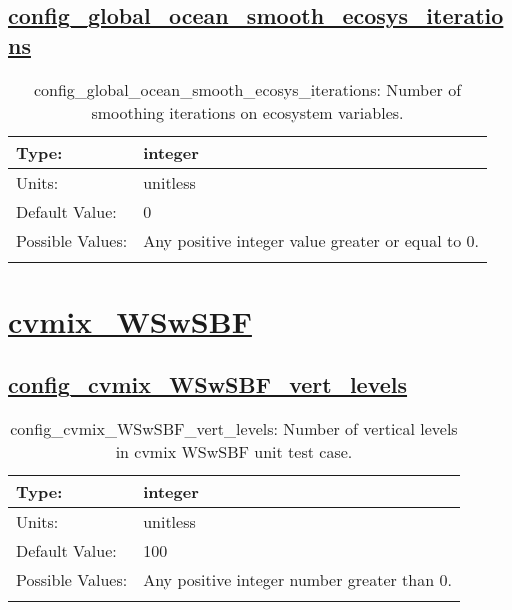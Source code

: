 \subsection[config\_global\_ocean\_smooth\_ecosys\_iterations]{\hyperref[sec:nm_tab_global_ocean]{config\_global\_ocean\_smooth\_ecosys\_iterations}}
\label{subsec:nm_sec_config_global_ocean_smooth_ecosys_iterations}
\begin{center}
\begin{longtable}{| p{2.0in} || p{4.0in} |}
    \hline
    Type: & integer \\
    \hline
    Units: & \si{unitless} \\
    \hline
    Default Value: & 0 \\
    \hline
    Possible Values: & Any positive integer value greater or equal to 0. \\
    \hline
    \caption{config\_global\_ocean\_smooth\_ecosys\_iterations: Number of smoothing iterations on ecosystem variables.}
\end{longtable}
\end{center}
\section[cvmix\_WSwSBF]{\hyperref[sec:nm_tab_cvmix_WSwSBF]{cvmix\_WSwSBF}}
\label{sec:nm_sec_cvmix_WSwSBF}
\subsection[config\_cvmix\_WSwSBF\_vert\_levels]{\hyperref[sec:nm_tab_cvmix_WSwSBF]{config\_cvmix\_WSwSBF\_vert\_levels}}
\label{subsec:nm_sec_config_cvmix_WSwSBF_vert_levels}
\begin{center}
\begin{longtable}{| p{2.0in} || p{4.0in} |}
    \hline
    Type: & integer \\
    \hline
    Units: & \si{unitless} \\
    \hline
    Default Value: & 100 \\
    \hline
    Possible Values: & Any positive integer number greater than 0. \\
    \hline
    \caption{config\_cvmix\_WSwSBF\_vert\_levels: Number of vertical levels in cvmix WSwSBF unit test case.}
\end{longtable}
\end{center}
